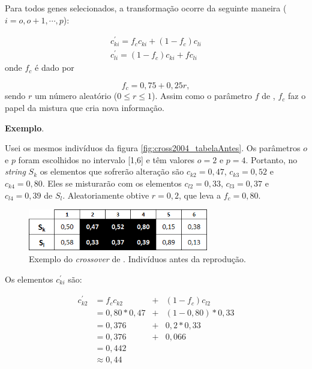 	Para todos genes selecionados, a transformação ocorre da seguinte maneira ($i = o, o + 1, \cdots, p$):
	
	\begin{equation}
		\begin{array}{l}
			c^{'}_{ki} = f_c c_{ki} + (1 - f_c) c_{li}     \\
			c^{'}_{li} = (1 - f_c) c_{ki} + f c_{li}
		\end{array}
	\end{equation}
	onde $f_c$ é dado por
	
	\begin{equation}
		f_c = 0,75 + 0,25r,
	\end{equation}
	sendo $r$ um número aleatório ($0 \leq r \leq 1$). Assim como o parâmetro $f$ de \cite{metodo2004}, $f_c$ faz o papel da mistura que cria nova informação.
	
	\textbf{Exemplo}.
	
	
	Usei os mesmos indivíduos da figura \ref{fig:cross2004_tabelaAntes}. Os parâmetros $o$ e $p$ foram escolhidos no intervalo [1,6] e têm valores $o = 2$ e $p = 4$. Portanto, no \emph{string} $S_k$ os elementos que sofrerão alteração são $c_{k2} = 0,47$, $c_{k3} = 0,52$ e $c_{k4} = 0,80$. Eles se misturarão com os elementos $c_{l2} = 0,33$, $c_{l3} = 0,37$ e $c_{l4} = 0,39$ de $S_l$. Aleatoriamente obtive $r = 0,2$, que leva a $f_c = 0,80$.
	
	\begin{figure}[htbp]
	\centering
		\includegraphics[width=0.70\textwidth]{figs/materiais_metodo/autovalores_com_ga/cross2011_tabelaAntes.png}
	\caption{Exemplo do \emph{crossover} de \cite{metodo2011}. Indivíduos antes da reprodução.}
	\label{fig:cross2011_tabelaAntes}
\end{figure}
	
	Os elementos $c^{'}_{ki}$ são:
	
	\begin{equation}
		\begin{array}{llcl}
			c^{'}_{k2}	& = f_c c_{k2} 		& + & (1- f_c) c_{l2} \\
									& = 0,80 * 0,47		& + &	(1 - 0,80) * 0,33 \\
									& = 0,376					& + & 0,2 * 0,33	\\
									& = 0,376					& + & 0,066	\\
									& = 0,442 \\
									& \approx 0,44
		\end{array}
	\end{equation}
	
